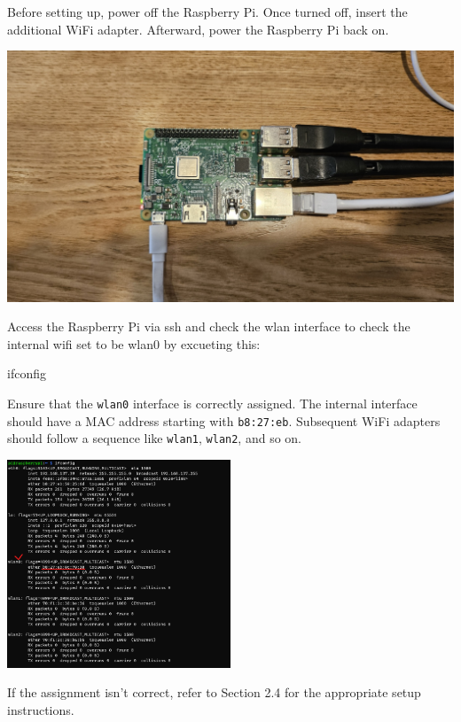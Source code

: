\documentclass[
  letterpaper,
]{scrbook}
\newenvironment{Shaded}{\begin{snugshade}}{\end{snugshade}}
\newcommand{\ExtensionTok}[1]{\textcolor[rgb]{0.00,0.23,0.31}{#1}}
\begin{document}
Before setting up, power off the Raspberry Pi. Once turned off, insert
the additional WiFi adapter. Afterward, power the Raspberry Pi back on.

\includegraphics{content/material/ch2/pi_plugged.jpg}

Access the Raspberry Pi via ssh and check the wlan interface to check
the internal wifi set to be wlan0 by excueting this:

\begin{Shaded}
\begin{Highlighting}[]
\ExtensionTok{ifconfig}
\end{Highlighting}
\end{Shaded}

Ensure that the \texttt{wlan0} interface is correctly assigned. The
internal interface should have a MAC address starting with
\texttt{b8:27:eb}. Subsequent WiFi adapters should follow a sequence
like \texttt{wlan1}, \texttt{wlan2}, and so on.

\includegraphics[width=0.5\textwidth,height=\textheight]{content/material/ch2/ifconfig_wlan_check.png}

If the assignment isn't correct, refer to Section 2.4 for the
appropriate setup instructions.
\end{document}

